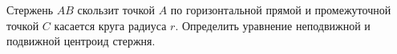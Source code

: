 Стержень $AB$ скользит точкой $A$ по горизонтальной прямой
и промежуточной точкой $C$ касается круга радиуса $r$.
Определить уравнение неподвижной и подвижной центроид стержня.

